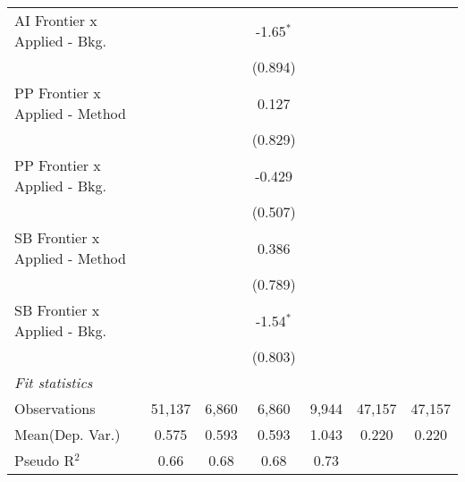 \begin{tabular}{lcccccc}
   AI Frontier x Applied - Bkg.   &               &               & -1.65$^{*}$   &               &        &   \\   
                                  &               &               & (0.894)       &               &        &   \\   
   PP Frontier x Applied - Method &               &               & 0.127         &               &        &   \\   
                                  &               &               & (0.829)       &               &        &   \\   
   PP Frontier x Applied - Bkg.   &               &               & -0.429        &               &        &   \\   
                                  &               &               & (0.507)       &               &        &   \\   
   SB Frontier x Applied - Method &               &               & 0.386         &               &        &   \\   
                                  &               &               & (0.789)       &               &        &   \\   
   SB Frontier x Applied - Bkg.   &               &               & -1.54$^{*}$   &               &        &   \\   
                                  &               &               & (0.803)       &               &        &   \\   
   \midrule
   \emph{Fit statistics}\\
   Observations                   & 51,137        & 6,860         & 6,860         & 9,944         & 47,157 & 47,157\\  
Mean(Dep. Var.) & 0.575 & 0.593 & 0.593 & 1.043 & 0.220 & 0.220 \\
   Pseudo R$^2$                   & 0.66          & 0.68          & 0.68          & 0.73          &        & \\  
   

\end{tabular}
